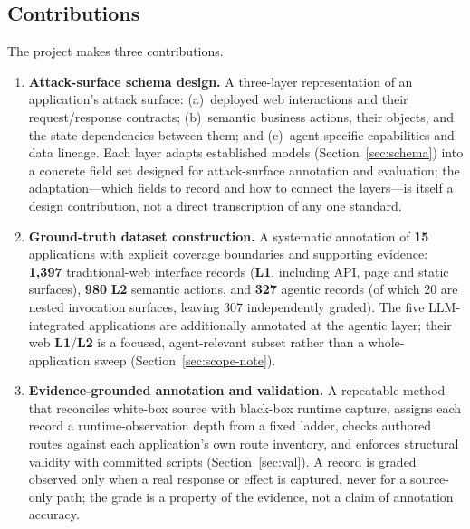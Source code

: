 \documentclass[11pt,a4paper]{article}
\renewcommand{\L}[1]{\textbf{L#1}}
\begin{document}
\subsection{Contributions}\label{sec:contrib}
The project makes three contributions.
\begin{enumerate}[leftmargin=1.6em,itemsep=3pt]
\item[\textbf{C1}] \textbf{Attack-surface schema design.} A three-layer representation of an
      application's attack surface: (a)~deployed web interactions and their request/response
      contracts; (b)~semantic business actions, their objects, and the state dependencies
      between them; and (c)~agent-specific capabilities and data lineage. Each layer adapts
      established models (Section~\ref{sec:schema}) into a concrete field set designed for
      attack-surface annotation and evaluation; the adaptation---which fields to record and
      how to connect the layers---is itself a design contribution, not a direct transcription
      of any one standard.
\item[\textbf{C2}] \textbf{Ground-truth dataset construction.} A systematic annotation of
      \textbf{15} applications with explicit coverage boundaries and supporting evidence:
      \textbf{1{,}397} traditional-web interface records (\L1, including API, page and static
      surfaces), \textbf{980} \L2 semantic actions, and \textbf{327} agentic records (of which
      20 are nested invocation surfaces, leaving 307 independently graded). The five
      LLM-integrated applications are additionally annotated at the agentic layer; their web
      \L1/\L2 is a focused, agent-relevant subset rather than a whole-application sweep
      (Section~\ref{sec:scope-note}).
\item[\textbf{C3}] \textbf{Evidence-grounded annotation and validation.} A repeatable method
      that reconciles white-box source with black-box runtime capture, assigns each record a
      runtime-observation depth from a fixed ladder, checks authored routes against each
      application's own route inventory, and enforces structural validity with committed
      scripts (Section~\ref{sec:val}). A record is graded observed only when a real response
      or effect is captured, never for a source-only path; the grade is a property of the
      evidence, not a claim of annotation accuracy.
\end{enumerate}

\end{document}
